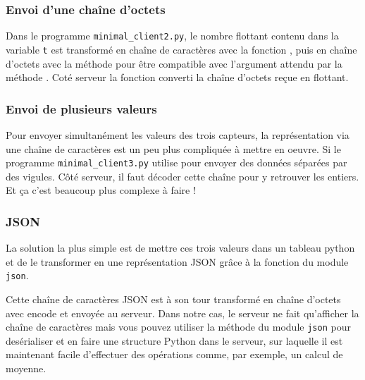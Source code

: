 \subsubsection{Envoi d'une chaîne d'octets}


Dans le programme \texttt{minimal\_client2.py}, le nombre flottant contenu dans la variable \texttt{t} est transformé en chaîne de caractères avec la fonction \texttt{}, puis en chaîne d'octets avec la méthode  pour être compatible avec l'argument attendu par la méthode . Coté serveur la fonction \texttt{} converti la chaîne d'octets reçue en flottant.

\subsubsection{Envoi de plusieurs valeurs}


Pour envoyer simultanément les valeurs des trois capteurs, la représentation via une chaîne de caractères est un peu plus compliquée à mettre en oeuvre. Si le programme \texttt{minimal\_client3.py} utilise  pour envoyer des données séparées par des vigules. Côté serveur, il faut décoder cette chaîne pour y retrouver les entiers. Et ça c'est beaucoup plus complexe à faire ! 

\subsubsection{JSON}


La solution la plus simple est de mettre ces trois valeurs dans un tableau python et de le transformer en une représentation JSON grâce à la fonction  du module \texttt{json}. 

     \vspace{1em}

Cette chaîne de caractères JSON est à son tour transformé en chaîne d'octets avec encode et envoyée au serveur. Dans notre cas, le serveur ne fait qu'afficher la chaîne de caractères mais vous pouvez utiliser la méthode  du module \texttt{json} pour desérialiser et en faire une structure Python dans le serveur, sur laquelle il est maintenant facile d'effectuer des opérations comme, par exemple, un calcul de moyenne.

